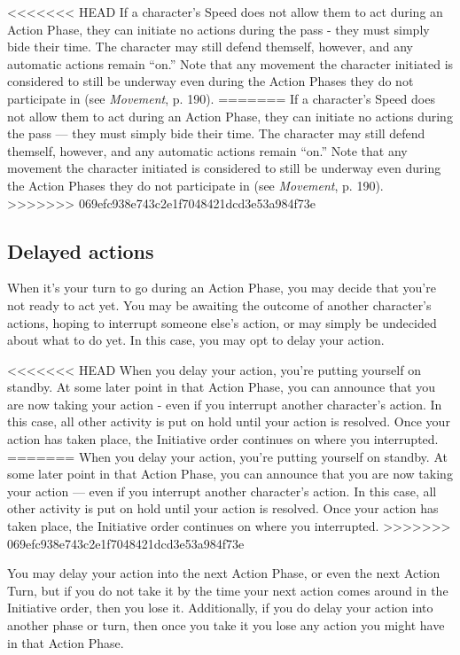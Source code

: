 <<<<<<< HEAD If a character’s Speed does not allow them to act during an Action Phase, they can initiate no actions during the pass - they must simply bide their time. The character may still defend themself, however, and any automatic actions remain ``on.'' Note that any movement the character initiated is considered to still be underway even during the Action Phases they do not participate in (see \emph{Movement}, p. 190). ======= If a character’s Speed does not allow them to act during an Action Phase, they can initiate no actions during the pass --- they must simply bide their time. The character may still defend themself, however, and any automatic actions remain ``on.'' Note that any movement the character initiated is considered to still be underway even during the Action Phases they do not participate in (see \emph{Movement}, p. 190). >>>>>>> 069efc938e743c2e1f7048421dcd3e53a984f73e 



\subsection{Delayed actions} \label{sec:delayed-actions} 

When it’s your turn to go during an Action Phase, you may decide that you’re not ready to act yet. You may be awaiting the outcome of another character’s actions, hoping to interrupt someone else’s action, or may simply be undecided about what to do yet. In this case, you may opt to delay your action. 

<<<<<<< HEAD When you delay your action, you’re putting yourself on standby. At some later point in that Action Phase, you can announce that you are now taking your action - even if you interrupt another character’s action. In this case, all other activity is put on hold until your action is resolved. Once your action has taken place, the Initiative order continues on where you interrupted. ======= When you delay your action, you’re putting yourself on standby. At some later point in that Action Phase, you can announce that you are now taking your action --- even if you interrupt another character’s action. In this case, all other activity is put on hold until your action is resolved. Once your action has taken place, the Initiative order continues on where you interrupted. >>>>>>> 069efc938e743c2e1f7048421dcd3e53a984f73e 

You may delay your action into the next Action Phase, or even the next Action Turn, but if you do not take it by the time your next action comes around in the Initiative order, then you lose it. Additionally, if you do delay your action into another phase or turn, then once you take it you lose any action you might have in that Action Phase. 



